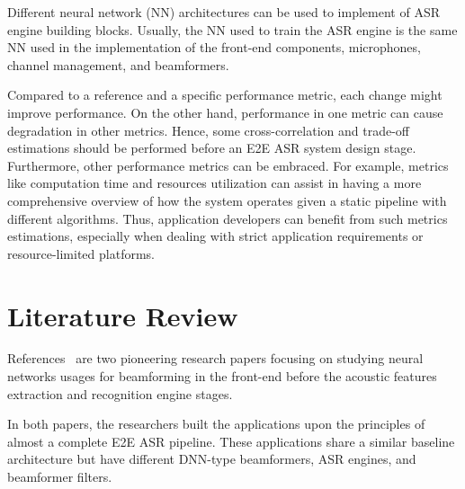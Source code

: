 \bigskip

Different neural network (NN) 
architectures can be used to
implement of ASR engine building blocks.
Usually, the NN used to train the ASR engine 
is the same NN used
in the implementation of the
front-end components, microphones, channel management,
and beamformers.



\bigskip

Compared to a reference and a specific performance metric, 
each change might improve performance. 
On the other hand,
performance in one metric can cause degradation in other metrics.
Hence, some cross-correlation and trade-off estimations
should be performed before an E2E ASR system design stage.
Furthermore, other performance metrics can be embraced.
For example, metrics like computation time and resources utilization
can assist in having a more comprehensive overview of how the system operates given a
static pipeline with different algorithms.
Thus, application
developers can benefit from such metrics estimations,
especially when dealing with strict 
application requirements or resource-limited platforms.


\section{Literature Review}
References~\cite{7472778, 7952160} are 
two pioneering research papers focusing on 
studying neural networks usages
for beamforming in the front-end
before the acoustic features extraction and
recognition engine stages.

\bigskip

In both papers, the researchers built the applications
upon the principles of almost a complete E2E ASR pipeline.
These applications share a similar baseline 
architecture but have different
DNN-type beamformers, ASR engines,
and beamformer filters.

